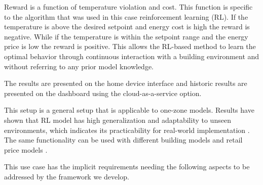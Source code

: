 

Reward is a function of temperature violation and cost. This function is specific to the algorithm that was used in this case reinforcement learning (RL). If the temperature is above the desired setpoint and energy cost is high the reward is negative. While if the temperature is within the setpoint range and the energy price is low the reward is positive. This allows the RL-based method to learn the optimal behavior through continuous interaction with a building environment and without referring to any prior model knowledge. 

The results are presented on the home device interface and historic results are presented on the dashboard using the cloud-as-a-service option.

This setup is a general setup that is applicable to one-zone models. Results have shown that RL model has high generalization and adaptability to unseen environments, which indicates its practicability for real-world implementation \cite{du2021intelligent}. The same functionality can be used with different building models and retail price models \cite{du2021intelligent}. 



This use case has the implicit requirements needing the following aspects to be addressed by the framework we develop.

